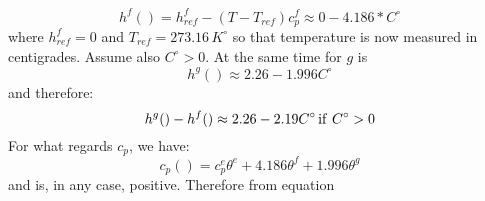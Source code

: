 \begin{equation}
h^f() = h^f_{ref} -(T-T_{ref})c_p^f \approx 0 - 4.186*  C^\circ   
\end{equation}
where \(h_{ref}^f=0\) and \(T_{ref} = 273.16\, K^\circ\) so that temperature is now measured in centigrades. Assume also \(C^\circ >0 \).
At the same time for \(g\) is 
\begin{equation}
h^g( ) \approx 2.26  - 1.996 C^\circ
\end{equation}
and therefore:
\begin{equation}
h^g()-h^f() \approx 2.26 - 2.19 C^\circ \, {\rm if}\ C^\circ > 0
\end{equation}
For what regards \( c_p\), we have:
\begin{equation}
c_p() = c_p^e \theta^e + 4.186 \theta^f + 1.996 \theta^g
\end{equation}
and is, in any case, positive.
Therefore from equation
